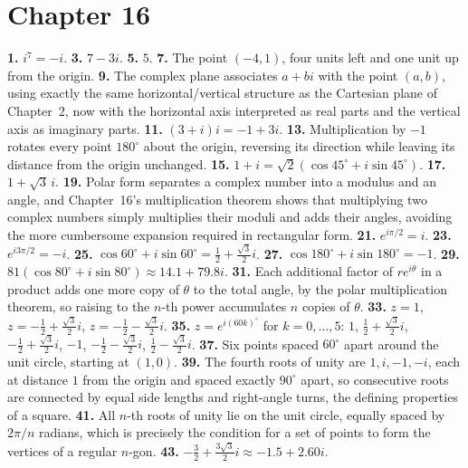 \section*{Chapter 16}
\textbf{1.} $i^7 = -i$. \quad
\textbf{3.} $7-3i$. \quad
\textbf{5.} $5$. \quad
\textbf{7.} The point $(-4,1)$, four units left and one unit up from the
origin. \quad
\textbf{9.} The complex plane associates $a+bi$ with the point $(a,b)$,
using exactly the same horizontal/vertical structure as the Cartesian
plane of Chapter~2, now with the horizontal axis interpreted as real
parts and the vertical axis as imaginary parts. \quad
\textbf{11.} $(3+i)i = -1+3i$. \quad
\textbf{13.} Multiplication by $-1$ rotates every point $180^\circ$
about the origin, reversing its direction while leaving its distance
from the origin unchanged. \quad
\textbf{15.} $1+i = \sqrt2(\cos45^\circ+i\sin45^\circ)$. \quad
\textbf{17.} $1+\sqrt3\,i$. \quad
\textbf{19.} Polar form separates a complex number into a modulus and an
angle, and Chapter~16's multiplication theorem shows that multiplying
two complex numbers simply multiplies their moduli and adds their
angles, avoiding the more cumbersome expansion required in rectangular
form. \quad
\textbf{21.} $e^{i\pi/2} = i$. \quad
\textbf{23.} $e^{i3\pi/2} = -i$. \quad
\textbf{25.} $\cos60^\circ+i\sin60^\circ = \tfrac12+\tfrac{\sqrt3}{2}i$.
\quad
\textbf{27.} $\cos180^\circ+i\sin180^\circ = -1$. \quad
\textbf{29.} $81(\cos80^\circ+i\sin80^\circ) \approx 14.1+79.8i$. \quad
\textbf{31.} Each additional factor of $re^{i\theta}$ in a product adds
one more copy of $\theta$ to the total angle, by the polar multiplication
theorem, so raising to the $n$-th power accumulates $n$ copies of
$\theta$. \quad
\textbf{33.} $z=1$, $z=-\tfrac12+\tfrac{\sqrt3}{2}i$,
$z=-\tfrac12-\tfrac{\sqrt3}{2}i$. \quad
\textbf{35.} $z = e^{i(60k)^\circ}$ for $k=0,\dots,5$: $1$,
$\tfrac12+\tfrac{\sqrt3}{2}i$, $-\tfrac12+\tfrac{\sqrt3}{2}i$, $-1$,
$-\tfrac12-\tfrac{\sqrt3}{2}i$, $\tfrac12-\tfrac{\sqrt3}{2}i$. \quad
\textbf{37.} Six points spaced $60^\circ$ apart around the unit circle,
starting at $(1,0)$. \quad
\textbf{39.} The fourth roots of unity are $1, i, -1, -i$, each at
distance $1$ from the origin and spaced exactly $90^\circ$ apart, so
consecutive roots are connected by equal side lengths and right-angle
turns, the defining properties of a square. \quad
\textbf{41.} All $n$-th roots of unity lie on the unit circle, equally
spaced by $2\pi/n$ radians, which is precisely the condition for a set
of points to form the vertices of a regular $n$-gon. \quad
\textbf{43.} $-\tfrac32+\tfrac{3\sqrt3}{2}i \approx -1.5+2.60i$. \quad
